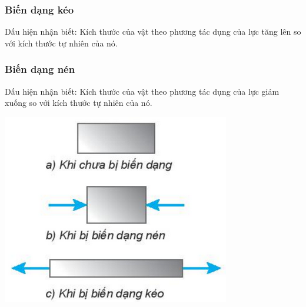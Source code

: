 \begin{minipage}{0.4\textwidth}
\subsubsection{Biến dạng kéo}
Dấu hiện nhận biết: Kích thước của vật theo phương tác dụng của lực tăng lên so với kích thước tự nhiên của nó.
\subsubsection{Biến dạng nén}
Dấu hiện nhận biết: Kích thước của vật theo phương tác dụng của lực giảm xuống so với kích thước tự nhiên của nó.
\end{minipage}
\begin{minipage}{0.4\textwidth}
	\begin{center}
		\includegraphics[scale=1]{../figs/G10-028-1}
	\end{center}
\end{minipage}

